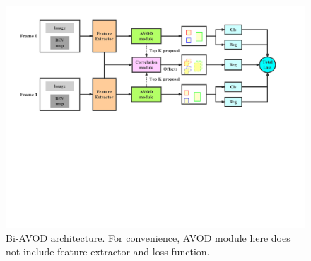 \documentclass{bmvc2k}
\begin{document}

\begin{figure}
	\rule{0pt}{1ex}
	\setlength{\abovecaptionskip}{-1.5cm}
	\begin{center}
		\includegraphics[trim={0cm, 10cm, 3cm, 1cm}, clip, width=\textwidth]{images/Bi-AVOD.pdf}
	\end{center}
	\caption{Bi-AVOD architecture. For convenience, AVOD module here does not include feature extractor and loss function.}
	\label{fig:bi-avod}
	\vspace{-0.5cm}
\end{figure}
\end{document}

